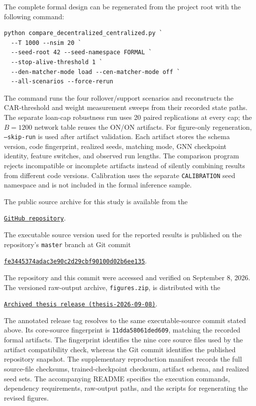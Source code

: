 The complete formal design can be regenerated from the project root with
the following command:

\begingroup\small
\begin{verbatim}
python compare_decentralized_centralized.py `
  --T 1000 --nsim 20 `
  --seed-root 42 --seed-namespace FORMAL `
  --stop-alive-threshold 1 `
  --den-matcher-mode load --cen-matcher-mode off `
  --all-scenarios --force-rerun
\end{verbatim}
\endgroup

The command runs the four rollover/support scenarios and reconstructs the
CAR-threshold and weight measurement sweeps from their recorded state
paths. The separate loan-cap robustness run uses 20 paired replications
at every cap; the \(B=1200\) network table reuses the ON/ON artifacts.
For figure-only regeneration, \texttt{--skip-run} is used after artifact
validation. Each
artifact stores the schema version, code fingerprint, realized seeds,
matching mode, GNN checkpoint identity, feature switches, and observed
run lengths. The comparison program rejects incompatible or incomplete
artifacts instead of silently combining results from different code
versions. Calibration uses the separate \texttt{CALIBRATION} seed
namespace and is not included in the formal inference sample.

The public source archive for this study is available from the
\begin{center}\small
\href{https://github.com/zhanghaoyu1232-debug/central-bank-simulation}{\texttt{GitHub repository}}.
\end{center}
The executable source version used for the reported results is published on
the repository's \texttt{master} branch at Git commit
\begin{center}\small
\href{https://github.com/zhanghaoyu1232-debug/central-bank-simulation/commit/fe3445374adac3e90c2d29cbf90100d02b6ee135}{\nolinkurl{fe3445374adac3e90c2d29cbf90100d02b6ee135}}.
\end{center}
The repository and this commit were accessed and verified on September 8,
2026.
The versioned raw-output archive, \texttt{figures.zip}, is distributed with
the
\begin{center}\small
\href{https://github.com/zhanghaoyu1232-debug/central-bank-simulation/releases/tag/thesis-2026-09-08}{\texttt{Archived thesis release (thesis-2026-09-08)}}.
\end{center}
The annotated release tag resolves to the same executable-source commit stated
above.
Its core-source fingerprint is \texttt{11dda58061ded609}, matching the
recorded formal artifacts. The fingerprint identifies the nine core source
files used by the artifact compatibility check, whereas the Git commit
identifies the published repository snapshot. The supplementary reproduction manifest
records the full source-file checksums, trained-checkpoint checksum,
artifact schema, and realized seed sets. The accompanying README specifies
the execution commands, dependency requirements, raw-output paths, and
the scripts for regenerating the revised figures.

